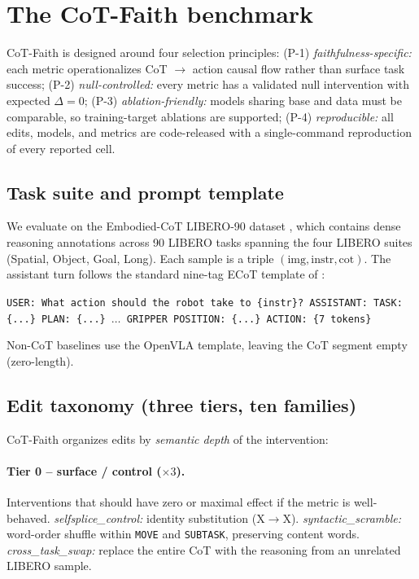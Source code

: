 \documentclass{article}
\begin{document}
\section{The CoT-Faith benchmark}
\label{sec:benchmark}

CoT-Faith is designed around four selection principles: (P-1) \emph{faithfulness-specific:} each metric operationalizes CoT $\to$ action causal flow rather than surface task success; (P-2) \emph{null-controlled:} every metric has a validated null intervention with expected $\Delta\!=\!0$; (P-3) \emph{ablation-friendly:} models sharing base and data must be comparable, so training-target ablations are supported; (P-4) \emph{reproducible:} all edits, models, and metrics are code-released with a single-command reproduction of every reported cell.

\subsection{Task suite and prompt template}

We evaluate on the Embodied-CoT LIBERO-90 dataset \citep{ecotlite}, which contains dense reasoning annotations across 90 LIBERO tasks spanning the four LIBERO suites (Spatial, Object, Goal, Long). Each sample is a triple $(\text{img}, \text{instr}, \text{cot})$. The assistant turn follows the standard nine-tag ECoT template of \citet{ecot}:
\begin{center}\small
\texttt{USER: What action should the robot take to \{instr\}? ASSISTANT: TASK: \{...\} PLAN: \{...\} $\ldots$ GRIPPER POSITION: \{...\} ACTION: \{7 tokens\}}
\end{center}
Non-CoT baselines use the OpenVLA template, leaving the CoT segment empty (zero-length).

\subsection{Edit taxonomy (three tiers, ten families)}
\label{sec:taxonomy}

CoT-Faith organizes edits by \emph{semantic depth} of the intervention:

\paragraph{Tier 0 -- surface / control ($\times 3$).} Interventions that should have zero or maximal effect if the metric is well-behaved.
\emph{selfsplice\_control:} identity substitution (X$\to$X). \emph{syntactic\_scramble:} word-order shuffle within \texttt{MOVE} and \texttt{SUBTASK}, preserving content words. \emph{cross\_task\_swap:} replace the entire CoT with the reasoning from an unrelated LIBERO sample.
\end{document}
